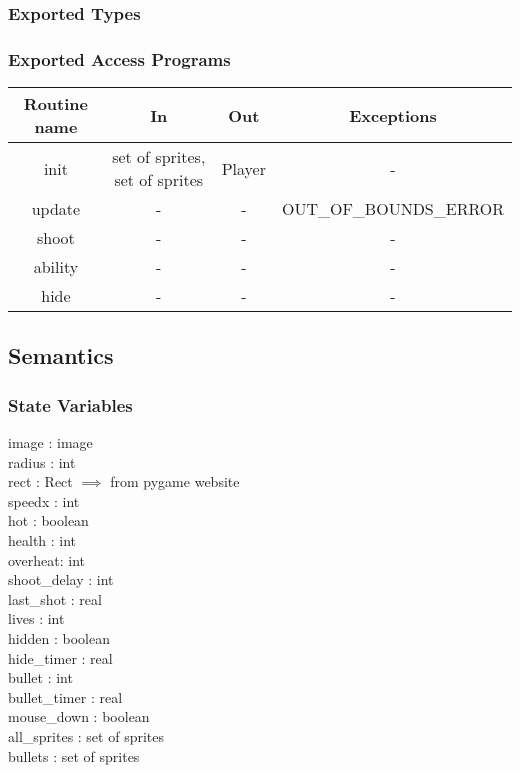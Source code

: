 \documentclass[12pt, titlepage]{article}
\begin{document}
\subsubsection {Exported Types}

\subsubsection {Exported Access Programs}

\begin{tabular}{| c | c | c | c |}
\hline
\textbf{Routine name} & \textbf{In} & \textbf{Out} & \textbf{Exceptions}\\
\hline
init & set of sprites, set of sprites & Player & -  \\
\hline
update & - & - & OUT\_OF\_BOUNDS\_ERROR\\
\hline
shoot & - & - & -\\
\hline
ability & - & - & -\\
\hline
hide & - & - & -\\
\hline
\end{tabular}

\subsection {Semantics}

\subsubsection {State Variables}
image : image\\
radius : int\\
rect : Rect $\implies$ from pygame website\\
speedx : int\\
hot : boolean\\
health : int\\
overheat: int\\
shoot\_delay : int\\
last\_shot : real\\
lives : int\\
hidden : boolean\\
hide\_timer : real\\
bullet : int\\
bullet\_timer : real\\
mouse\_down : boolean\\
all\_sprites : set of sprites\\
bullets : set of sprites\\
\end{document}
